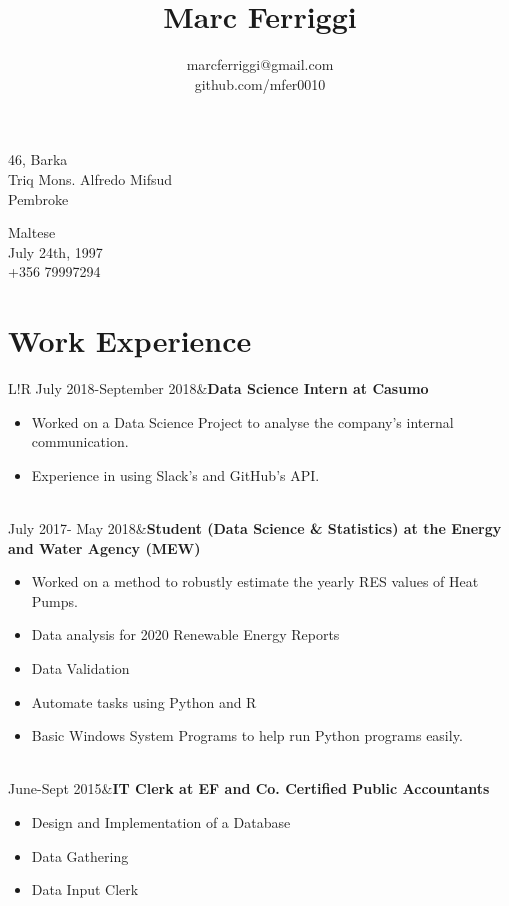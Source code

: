 \documentclass[10pt]{article}
\title{\bfseries\Huge Marc Ferriggi}
\author{marcferriggi@gmail.com\\github.com/mfer0010}
\date{}
\newcommand\VRule{\color{lightgray}\vrule width 0.5pt}
\begin{document}
	\maketitle
	
	\begin{minipage}[ht]{0.75\textwidth}
		46, Barka\\
		Triq Mons. Alfredo Mifsud\\
		Pembroke
	\end{minipage}
	\begin{minipage}[ht]{0.2\textwidth}
		Maltese\\
		July 24th, 1997\\
		+356 79997294
	\end{minipage}
	\vspace{15pt}
	\section*{Work Experience}
	\begin{tabular}{L!{\VRule}R}
		July 2018-September 2018&\textbf{Data Science Intern at Casumo}
		\begin{itemize}
			\renewcommand\labelitemi{-$>$}
			\item Worked on a Data Science Project to analyse the company's internal communication. 
			\item Experience in using Slack's and GitHub's API. 
		\end{itemize}\\
		July 2017- May 2018&\textbf{Student (Data Science \& Statistics) at the Energy and Water Agency (MEW)}
		\begin{itemize}
			\renewcommand\labelitemi{-$>$}
			\item Worked on a method to robustly estimate the yearly RES values of Heat Pumps. 
			\item Data analysis for 2020 Renewable Energy Reports
			\item Data Validation
			\item Automate tasks using Python and R
			\item Basic Windows System Programs to help run Python programs easily. 
		\end{itemize}\\
		June-Sept 2015&\textbf{IT Clerk at EF and Co. Certified Public Accountants}
		\begin{itemize}
			\renewcommand\labelitemi{-$>$}
			\item Design and Implementation of a Database
			\item Data Gathering
			\item Data Input Clerk
		\end{itemize}\\
	\end{tabular}\\
\end{document}
